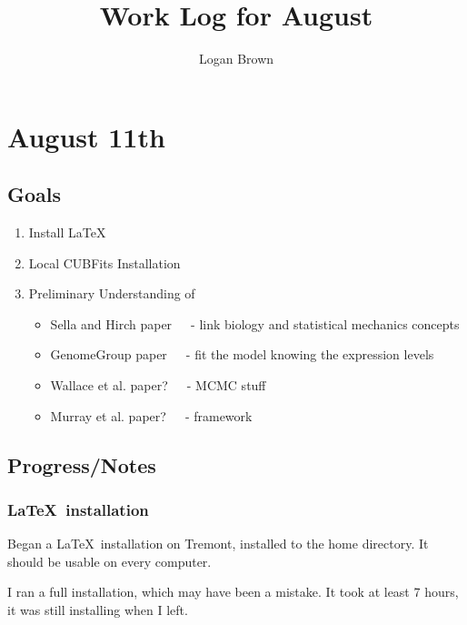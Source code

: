 \title{Work Log for August}
\author{Logan Brown}


\maketitle
\tableofcontents
\newpage


\setcounter{section}{10}
\setcounter{subsection}{-1}
\setcounter{subsubsection}{0}

\section{August 11th}
\subsection{Goals}
\begin{enumerate}

\item Install \LaTeX
\item Local CUBFits Installation
\item Preliminary Understanding of
\begin{itemize}

\item Sella and Hirch paper~~~- link biology and statistical mechanics concepts
\item GenomeGroup paper~~~- fit the model knowing the expression levels
\item Wallace et al. paper?~~~- MCMC stuff
\item Murray et al. paper?~~~- framework

\end{itemize}
\end{enumerate}

\subsection{Progress/Notes}

\subsubsection{\LaTeX~installation}

Began a \LaTeX~installation on Tremont, installed to the home directory. It should be usable on every computer.

I ran a full installation, which may have been a mistake. It took at least 7 hours, it was still installing when I left.

